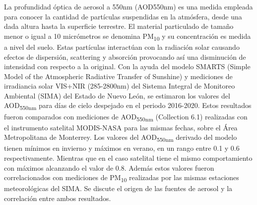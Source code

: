 La profundidad óptica de aerosol a 550nm (AOD550nm) es una medida empleada para conocer la cantidad de partículas suspendidas en la atmósfera, desde una dada altura hasta la superficie terrestre. El material particulado de tamaño menor o igual a 10 micrómetros se denomina PM\textsubscript{10} y su concentración es medida a nivel del suelo. Estas partículas interactúan con la radiación solar causando efectos de dispersión, scattering y absorción provocando así una disminución de intensidad con respecto a la original. Con la ayuda del modelo SMARTS (Simple Model of the Atmospheric Radiative Transfer of Sunshine) y mediciones de irradiancia solar VIS+NIR (285-2800nm) del Sistema Integral de Monitoreo Ambiental (SIMA) del Estado de Nuevo León, se estimaron los valores del AOD\textsubscript{550nm} para días de cielo despejado en el periodo 2016-2020. Estos resultados fueron comparados con mediciones de AOD\textsubscript{550nm} (Collection 6.1) realizadas con el instrumento satelital MODIS-NASA para las mismas fechas, sobre el Área Metropolitana de Monterrey. Los valores del AOD\textsubscript{550nm} derivado del modelo tienen mínimos en invierno y máximos en verano, en un rango entre 0.1 y 0.6 respectivamente. Mientras que en el caso satelital tiene el mismo comportamiento con máximos alcanzando el valor de 0.8. Además estos valores fueron correlacionados con mediciones de PM\textsubscript{10} realizadas por las  mismas estaciones meteorológicas del SIMA. Se discute el origen de las fuentes de aerosol y la correlación entre ambos resultados.